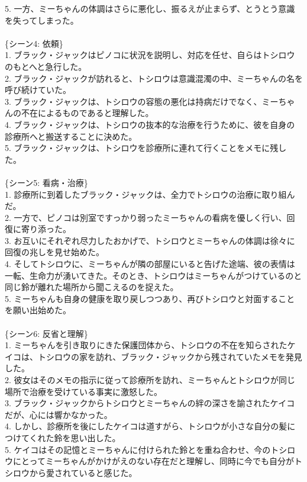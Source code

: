 \documentclass[a4j,12pt]{jsreport}
\begin{document}
\begin{breakitembox}
   5. 一方、ミーちゃんの体調はさらに悪化し、振るえが止まらず、とうとう意識を失ってしまった。\\
   \\
   \{シーン4: 依頼\}\\
   1. ブラック・ジャックはピノコに状況を説明し、対応を任せ、自らはトシロウのもとへと急行した。\\
   2. ブラック・ジャックが訪れると、トシロウは意識混濁の中、ミーちゃんの名を呼び続けていた。\\
   3. ブラック・ジャックは、トシロウの容態の悪化は持病だけでなく、ミーちゃんの不在によるものであると理解した。\\
   4. ブラック・ジャックは、トシロウの抜本的な治療を行うために、彼を自身の診療所へと搬送することに決めた。\\
   5. ブラック・ジャックは、トシロウを診療所に連れて行くことをメモに残した。\\
   \\
   \{シーン5: 看病・治療\}\\
   1. 診療所に到着したブラック・ジャックは、全力でトシロウの治療に取り組んだ。\\
   2. 一方で、ピノコは別室ですっかり弱ったミーちゃんの看病を優しく行い、回復に寄り添った。\\
   3. お互いにそれぞれ尽力したおかげで、トシロウとミーちゃんの体調は徐々に回復の兆しを見せ始めた。\\
   4. そしてトシロウに、ミーちゃんが隣の部屋にいると告げた途端、彼の表情は一転、生命力が湧いてきた。そのとき、トシロウはミーちゃんがつけているのと同じ鈴が離れた場所から聞こえるのを捉えた。\\
   5. ミーちゃんも自身の健康を取り戻しつつあり、再びトシロウと対面することを願い出始めた。\\
   \\
   \{シーン6: 反省と理解\}\\
   1. ミーちゃんを引き取りにきた保護団体から、トシロウの不在を知らされたケイコは、トシロウの家を訪れ、ブラック・ジャックから残されていたメモを発見した。\\
   2. 彼女はそのメモの指示に従って診療所を訪れ、ミーちゃんとトシロウが同じ場所で治療を受けている事実に激怒した。\\
   3. ブラック・ジャックからトシロウとミーちゃんの絆の深さを諭されたケイコだが、心には響かなかった。\\
   4. しかし、診療所を後にしたケイコは道すがら、トシロウが小さな自分の髪につけてくれた鈴を思い出した。\\
   5. ケイコはその記憶とミーちゃんに付けられた鈴とを重ね合わせ、今のトシロウにとってミーちゃんがかけがえのない存在だと理解し、同時に今でも自分がトシロウから愛されていると感じた。\\

\end{breakitembox}
\end{document}
